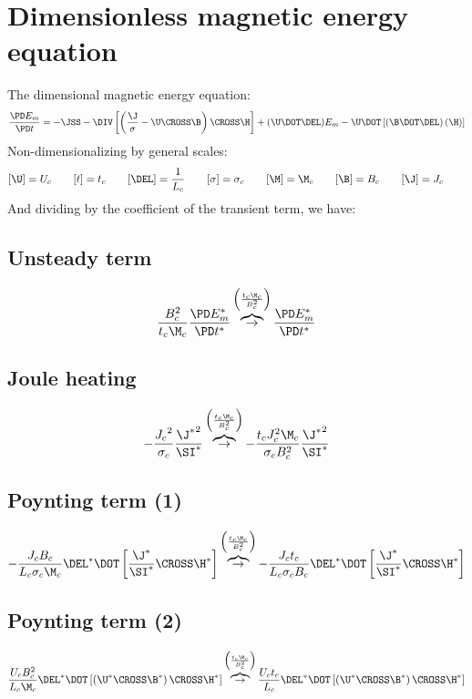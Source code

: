 \documentclass[landscape,11pt]{article}
\newcommand{\OB}{\overbrace{\rightarrow}^{\left(\frac{t_c \M_c}{B_c^2}\right)}}
\begin{document}
\doublespacing
\MOONSTITLE
\maketitle

\section{Dimensionless magnetic energy equation}
The dimensional magnetic energy equation:
\begin{equation}
	\frac{\PD E_m}{\PD t} =
	- \JSS
	- \DIV \left[\left(\frac{\J}{\sigma} - \U \CROSS \B \right) \CROSS \H \right]
	+ (\U \DOT \DEL) E_m
	- \U \DOT \left[(\B \DOT \DEL) \left( \H \right) \right]
\end{equation}
Non-dimensionalizing by general scales:
\begin{equation}\begin{aligned}
	[\U] = U_c \qquad
	[t] = t_c \qquad
	[\DEL] = \frac{1}{L_c} \qquad
	[\sigma] = \sigma_c \qquad
	[\M] = \M_c \qquad
	[\B] = B_c \qquad
	[\J] = J_c \qquad
\end{aligned}\end{equation}
And dividing by the coefficient of the transient term, we have:
\subsection{Unsteady term}
\begin{equation}
	\frac{B_c^2}{t_c \M_c} \frac{\PD E_m^*}{\PD t^*}
	\OB
	\frac{\PD E_m^*}{\PD t^*}
\end{equation}
\subsection{Joule heating}
\begin{equation}
	- \frac{{J_c}^2}{\sigma_c} \frac{{\J^*}^2}{\SI^*}
	\OB
	- \frac{t_c J_c^2 \M_c}{\sigma_c B_c^2} \frac{{\J^*}^2}{\SI^*}
\end{equation}
\subsection{Poynting term (1)}
\begin{equation}
	- \frac{J_c B_c}{L_c \sigma_c \M_c} \DEL^* \DOT \left[\frac{\J^*}{\SI^*} \CROSS \H^* \right]
	\OB
	- \frac{J_c t_c}{L_c \sigma_c B_c} \DEL^* \DOT \left[\frac{\J^*}{\SI^*} \CROSS \H^* \right]
\end{equation}
\subsection{Poynting term (2)}
\begin{equation}
	\frac{U_c B_c^2}{L_c \M_c} \DEL^* \DOT \left[\left(\U^* \CROSS \B^* \right) \CROSS \H^* \right]
	\OB
	\frac{U_c t_c}{L_c} \DEL^* \DOT \left[\left(\U^* \CROSS \B^* \right) \CROSS \H^* \right]
\end{equation}
\end{document}

